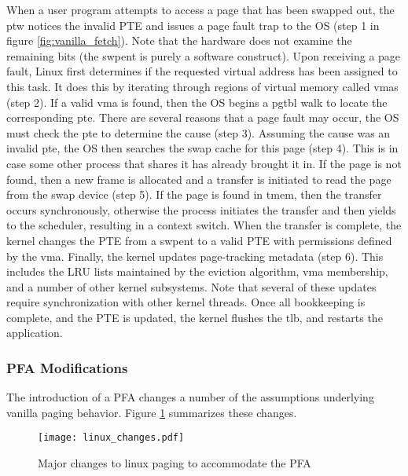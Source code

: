 When a user program attempts to access a page that has been swapped out, the
\gls{ptw} notices the invalid PTE and issues a page fault trap to the OS (step
1 in figure \ref{fig:vanilla_fetch}). Note that the hardware does not examine
the remaining bits (the \gls{swpent} is purely a software construct). Upon
receiving a page fault, Linux first determines if the requested virtual address
has been assigned to this task. It does this by iterating through regions of
virtual memory called \glspl{vma} (step 2). If a valid \gls{vma} is found, then
the OS begins a \gls{pgtbl} walk to locate the corresponding \gls{pte}. There
are several reasons that a page fault may occur, the OS must check the
\gls{pte} to determine the cause (step 3). Assuming the cause was an invalid
\gls{pte}, the OS then searches the swap cache for this page (step 4). This is
in case some other process that shares it has already brought it in. If the
page is not found, then a new frame is allocated and a transfer is initiated to
read the page from the swap device (step 5). If the page is found in
\gls{tmem}, then the transfer occurs synchronously, otherwise the process
initiates the transfer and then yields to the scheduler, resulting in a context
switch. When the transfer is complete, the kernel changes the PTE from a
\gls{swpent} to a valid PTE with permissions defined by the \gls{vma}. Finally,
the kernel updates page-tracking metadata (step 6). This includes the LRU lists
maintained by the eviction algorithm, \gls{vma} membership, and a number of
other kernel subsystems. Note that several of these updates require
synchronization with other kernel threads. Once all bookkeeping is complete,
and the PTE is updated, the kernel flushes the \gls{tlb}, and restarts the
application.

\FloatBarrier 
\subsubsection{PFA Modifications}
The introduction of a PFA changes a number of the assumptions underlying
vanilla paging behavior. Figure \ref{fig:linux_changes} summarizes these
changes.

\begin{figure}[h] \centering
  \texttt{[image: linux\_changes.pdf]}
  \caption{Major changes to linux paging to accommodate the PFA}
  \label{fig:linux_changes}
\end{figure}

